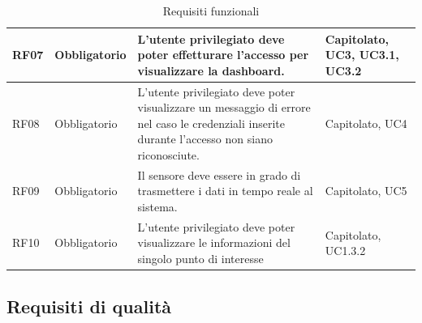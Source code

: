 \documentclass[11pt]{article}
\begin{document}
\begin{justify}
\begin{table}[H]
\begin{tabular}{|>{\centering\arraybackslash}m{2.7cm}|>{\centering\arraybackslash}m{2.7cm}|>{\centering\arraybackslash}m{6cm}|>{\centering\arraybackslash}m{2.1cm}|}
\hline
RF07 & Obbligatorio & L'utente privilegiato deve poter effetturare l'accesso per visualizzare la dashboard. & Capitolato, UC3, UC3.1, UC3.2\\
\hline
RF08 & Obbligatorio & L'utente privilegiato deve poter visualizzare un messaggio di errore nel caso le credenziali inserite durante l'accesso non siano riconosciute. & Capitolato, UC4\\
\hline
RF09 & Obbligatorio & Il sensore deve essere in grado di trasmettere i dati in tempo reale al sistema. & Capitolato, UC5\\
\hline
RF10 & Obbligatorio & L'utente privilegiato deve poter visualizzare le informazioni del singolo punto di interesse & Capitolato, UC1.3.2\\
\hline
\end{tabular}
\caption{Requisiti funzionali}
\end{table}

\newpage
\subsection{Requisiti di qualità}


\end{justify}
\end{document}
